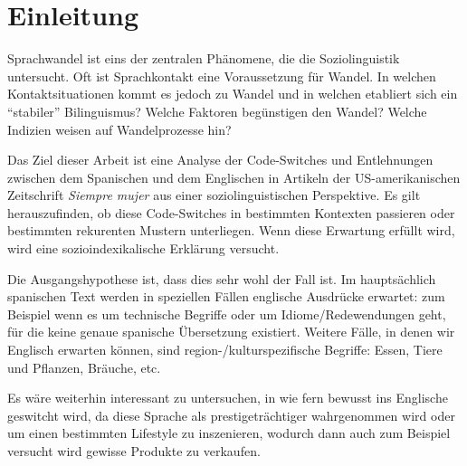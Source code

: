 \section{Einleitung}

\begin{comment}
* ca 3/4 Seiten
* Untersuchungsgegenstand
* Erkenntnisinteresse
* Forschungsstand
* Vorgehensweise: also Section 2 macht blabla, Section 3 blablup, ....
* Ergebnisse können/sollen angedeuten werden
\end{comment}



Sprachwandel ist eins der zentralen Phänomene, die die Soziolinguistik untersucht.
Oft ist Sprachkontakt eine Voraussetzung für Wandel.
In welchen Kontaktsituationen kommt es jedoch zu Wandel und in welchen etabliert sich ein ``stabiler'' Bilinguismus?
Welche Faktoren begünstigen den Wandel?
Welche Indizien weisen auf Wandelprozesse hin?


Das Ziel dieser Arbeit ist eine Analyse der Code-Switches und Entlehnungen zwischen dem Spanischen und dem Englischen in Artikeln der US-amerikanischen Zeitschrift \textit{Siempre mujer} aus einer soziolinguistischen Perspektive.
Es gilt herauszufinden, ob diese Code-Switches in bestimmten Kontexten passieren oder bestimmten rekurenten Mustern unterliegen.
Wenn diese Erwartung erfüllt wird, wird eine sozioindexikalische Erklärung versucht.

Die Ausgangshypothese ist, dass dies sehr wohl der Fall ist.
Im hauptsächlich spanischen Text werden in speziellen Fällen englische Ausdrücke erwartet:
zum Beispiel wenn es um technische Begriffe oder um Idiome/Redewendungen geht, für die keine genaue spanische Übersetzung existiert.
Weitere Fälle, in denen wir Englisch erwarten können, sind region-/kulturspezifische Begriffe: Essen, Tiere und Pflanzen, Bräuche, etc.

Es wäre weiterhin interessant zu untersuchen, in wie fern bewusst ins Englische geswitcht wird, da diese Sprache als prestigeträchtiger wahrgenommen wird oder um einen bestimmten Lifestyle zu inszenieren, wodurch dann auch zum Beispiel versucht wird gewisse Produkte zu verkaufen.

